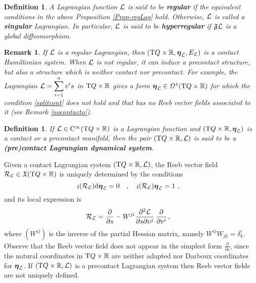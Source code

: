 \documentclass[12pt]{report}
\newtheorem{definition}[teor]{Definition}
\newtheorem{remark}[teor]{Remark}
\def\dst{\displaystyle}
\def\derpar#1#2{\frac{\partial{#1}}{\partial{#2}}}
\def\vf{\mathfrak X}
\def\df{{\mit\Omega}}
\def\Lag{{\cal L}}
\def\d{{\rm d}}
\def\Real{\mathbb{R}}
\def\bmeta{\mbox{\boldmath $\eta$}}
\def\Tan{{\rm T}}
\def\inn{\mathop{i}\nolimits}
\def\Cinfty{{\rm C}^\infty}
\newcommand{\Reeb}{\mathcal{R}}
\begin{document}
\begin{definition}
A Lagrangian function $\Lag$ is said to be {\sl\textbf{regular}} if the equivalent
conditions in the above Proposition \ref{Prop-regLag} hold.
Otherwise, $\Lag$ is called a {\sl\textbf{singular}} Lagrangian.
In particular, 
$\Lag$ is said to be {\sl\textbf{hyperregular}} 
if $\mathfrak{F}\Lag$ is a global diffeomorphism.
\end{definition}

\begin{remark}
\label{nocontact}{\rm
If $\Lag$ is a regular Lagrangian, then
$(\Tan Q\times\Real,\bmeta_\Lag,E_\Lag)$
is a contact Hamiltonian system.
When $\Lag$ is not regular, it can induce a precontact structure, but also a structure which is neither contact nor precontact.
For example, 
the Lagrangian $\displaystyle \Lag=\sum_{i=1}^n v^i s$ in $\Tan Q\times\Real$
gives a form $\bmeta_\Lag\in\df^1(\Tan Q\times\Real)$
for which the condition \eqref{splitcont} does not hold
and that has no Reeb vector fields associated to it
(see Remark \ref{nocontacto}).
}\end{remark}

\begin{definition}
If $\Lag \in \Cinfty (\Tan Q\times\Real)$ is a Lagrangian function and $(\Tan Q\times\Real,\bmeta_\Lag)$ is
a contact or a precontact manifold, then
the pair $(\Tan Q\times\Real,\Lag)$ is said to be a {\sl\textbf{(pre)contact Lagrangian dynamical system}}.
\label{stdlr1}
\end{definition}

Given a contact Lagrangian system $(\Tan Q\times\Real,\Lag)$, the Reeb vector field $\Reeb_\Lag\in\vf(\Tan Q\times\Real)$ is uniquely determined by the conditions
\begin{equation}\label{eq:reeb}
    \inn(\Reeb_\Lag)\d\bmeta_\Lag=0 \quad ,\quad \inn(\Reeb_\Lag)\bmeta_\Lag=1 \ ,
\end{equation}
and its local expression is
\begin{equation}
\label{coorReeb}
\Reeb_\Lag=\frac{\partial}{\partial s}-W^{ji}\frac{\partial^2\Lag}{\partial s \partial v^j}\,\frac{\partial}{\partial v^i} \,,
\end{equation}
where $(W^{ij})$ is the inverse of the partial Hessian matrix,
namely 
$W^{ij} W_{jk} = \delta^i_{k}$.
Observe that the Reeb vector field does not appear
in the simplest form $\dst\derpar{}{s}$,
since the natural coordinates in $\Tan Q \times \Real$
are neither adapted nor Darboux coordinates for $\bmeta_\Lag$.
If $(\Tan Q\times\Real,\Lag)$ is a precontact Lagrangian system then Reeb vector fields are not uniquely defined.
\end{document}
